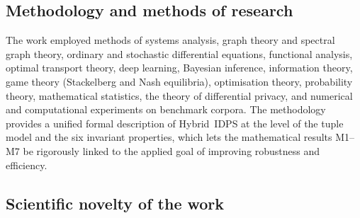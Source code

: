 \documentclass[12pt,a5paper]{article}
\begin{document}
\subsection*{Methodology and methods of research}

The work employed methods of systems analysis, graph theory
and spectral graph theory, ordinary and stochastic differential
equations, functional analysis, optimal transport theory,
deep learning, Bayesian inference, information theory, game
theory (Stackelberg and Nash equilibria), optimisation theory,
probability theory, mathematical statistics, the theory of
differential privacy, and numerical and computational
experiments on benchmark corpora. The methodology provides a
unified formal description of Hybrid~IDPS at the level of the
tuple model and the six invariant properties, which lets the
mathematical results M1--M7 be rigorously linked to the applied
goal of improving robustness and efficiency.

\subsection*{Scientific novelty of the work}
\end{document}
